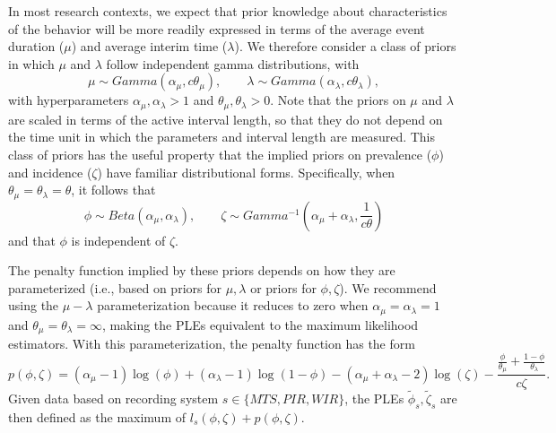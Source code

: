 \documentclass[man, noextraspace, floatsintext]{apa6}\usepackage[]{graphicx}\usepackage[]{color}
\begin{document}
In most research contexts, we expect that prior knowledge about characteristics of the behavior will be more readily expressed in terms of the average event duration ($\mu$) and average interim time ($\lambda$). 
We therefore consider a class of priors in which $\mu$ and $\lambda$ follow independent gamma distributions, with \[
\mu \sim Gamma\left(\alpha_\mu, c \theta_\mu\right), \qquad \lambda \sim Gamma\left(\alpha_\lambda, c \theta_\lambda\right), \]
with hyperparameters $\alpha_\mu, \alpha_\lambda > 1$ and $\theta_\mu, \theta_\lambda > 0$. 
Note that the priors on $\mu$ and $\lambda$ are scaled in terms of the active interval length, so that they do not depend on the time unit in which the parameters and interval length are measured. 
This class of priors has the useful property that the implied priors on prevalence ($\phi$) and incidence ($\zeta$) have familiar distributional forms. 
Specifically, when $\theta_\mu = \theta_\lambda = \theta$, it follows that \[
\phi \sim Beta\left(\alpha_\mu, \alpha_\lambda \right), \qquad \zeta \sim Gamma^{-1}\left(\alpha_\mu + \alpha_\lambda, \frac{1}{c\theta} \right) \]
and that $\phi$ is independent of $\zeta$. 

The penalty function implied by these priors depends on how they are parameterized (i.e., based on priors for $\mu, \lambda$ or priors for $\phi, \zeta$). We recommend using the $\mu-\lambda$ parameterization because it reduces to zero when $\alpha_\mu = \alpha_\lambda = 1$ and $\theta_\mu = \theta_\lambda = \infty$, making the PLEs equivalent to the maximum likelihood estimators.
With this parameterization, the penalty function has the form 
\begin{equation}
p\left(\phi, \zeta\right) = \left(\alpha_\mu - 1\right) \log \left(\phi\right) + \left(\alpha_\lambda - 1\right) \log \left(1 - \phi\right) - \left(\alpha_\mu + \alpha_\lambda - 2\right) \log\left(\zeta\right) - \frac{\frac{\phi}{\theta_\mu} + \frac{1-\phi}{\theta_\lambda}}{c \zeta}.
\end{equation}
Given data based on recording system $s \in \{MTS, PIR, WIR\}$, the PLEs $\tilde\phi_s, \tilde\zeta_s$ are then defined as the maximum of $l_s\left(\phi, \zeta\right) + p\left(\phi, \zeta\right)$. 
\end{document}
